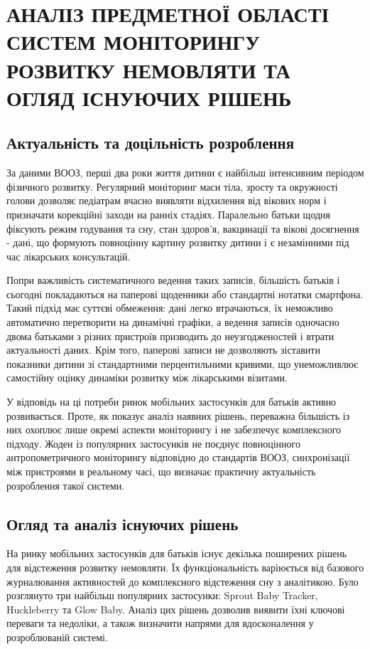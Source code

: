 
\section{АНАЛІЗ ПРЕДМЕТНОЇ ОБЛАСТІ СИСТЕМ МОНІТОРИНГУ РОЗВИТКУ НЕМОВЛЯТИ ТА ОГЛЯД ІСНУЮЧИХ РІШЕНЬ}

\subsection{Актуальність та доцільність розроблення}

За даними \gls{ВООЗ}, перші два роки життя дитини є найбільш інтенсивним періодом фізичного розвитку. Регулярний моніторинг маси тіла, зросту та окружності голови дозволяє педіатрам вчасно виявляти відхилення від вікових норм і призначати корекційні заходи на ранніх стадіях. Паралельно батьки щодня фіксують режим годування та сну, стан здоров'я, вакцинації та вікові досягнення - дані, що формують повноцінну картину розвитку дитини і є незамінними під час лікарських консультацій.

Попри важливість систематичного ведення таких записів, більшість батьків і сьогодні покладаються на паперові щоденники або стандартні нотатки смартфона. Такий підхід має суттєві обмеження: дані легко втрачаються, їх неможливо автоматично перетворити на динамічні графіки, а ведення записів одночасно двома батьками з різних пристроїв призводить до неузгодженостей і втрати актуальності даних. Крім того, паперові записи не дозволяють зіставити показники дитини зі стандартними перцентильними кривими, що унеможливлює самостійну оцінку динаміки розвитку між лікарськими візитами.

У відповідь на ці потреби ринок мобільних застосунків для батьків активно розвивається. Проте, як показує аналіз наявних рішень, переважна більшість із них охоплює лише окремі аспекти моніторингу і не забезпечує комплексного підходу. Жоден із популярних застосунків не поєднує повноцінного антропометричного моніторингу відповідно до стандартів \gls{ВООЗ}, синхронізації між пристроями в реальному часі, що визначає практичну актуальність розроблення такої системи.

\subsection{Огляд та аналіз існуючих рішень}

На ринку мобільних застосунків для батьків існує декілька поширених рішень для відстеження розвитку немовляти. Їх функціональність варіюється від базового журналювання активностей до комплексного відстеження сну з аналітикою. Було розглянуто три найбільш популярних застосунки: Sprout Baby Tracker, Huckleberry та Glow Baby. Аналіз цих рішень дозволив виявити їхні ключові переваги та недоліки, а також визначити напрями для вдосконалення у розроблюваній системі.

